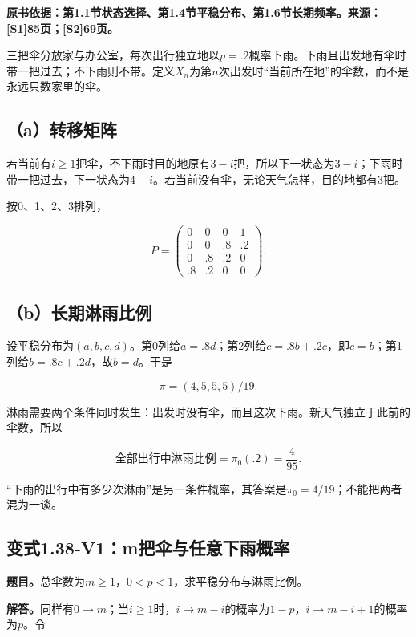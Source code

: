 \documentclass[
  11pt,
  a4paper,
  UTF8,
  fontset=fandol]{ctexart}
\begin{document}
\textbf{原书依据：第1.1节状态选择、第1.4节平稳分布、第1.6节长期频率。来源：{[}S1{]}85页；{[}S2{]}69页。}

三把伞分放家与办公室，每次出行独立地以\(p=.2\)概率下雨。下雨且出发地有伞时带一把过去；不下雨则不带。定义\(X_n\)为第\(n\)次出发时``当前所在地''的伞数，而不是永远只数家里的伞。

\subsection{（a）转移矩阵}\label{aux8f6cux79fbux77e9ux9635}

若当前有\(i\ge1\)把伞，不下雨时目的地原有\(3-i\)把，所以下一状态为\(3-i\)；下雨时带一把过去，下一状态为\(4-i\)。若当前没有伞，无论天气怎样，目的地都有3把。

按0、1、2、3排列，

\[
P=\begin{pmatrix}
0&0&0&1\\0&0&.8&.2\\0&.8&.2&0\\.8&.2&0&0
\end{pmatrix}.
\]

\subsection{（b）长期淋雨比例}\label{bux957fux671fux6dcbux96e8ux6bd4ux4f8b}

设平稳分布为\((a,b,c,d)\)。第0列给\(a=.8d\)；第2列给\(c=.8b+.2c\)，即\(c=b\)；第1列给\(b=.8c+.2d\)，故\(b=d\)。于是

\[
\boxed{\pi=(4,5,5,5)/19.}
\]

淋雨需要两个条件同时发生：出发时没有伞，而且这次下雨。新天气独立于此前的伞数，所以

\[
\boxed{\text{全部出行中淋雨比例}=\pi_0(.2)=\frac4{95}.}
\]

``下雨的出行中有多少次淋雨''是另一条件概率，其答案是\(\pi_0=4/19\)；不能把两者混为一谈。

\subsection{变式1.38-V1：m把伞与任意下雨概率}\label{ux53d8ux5f0f1.38-v1mux628aux4f1eux4e0eux4efbux610fux4e0bux96e8ux6982ux7387}

\textbf{题目。}总伞数为\(m\ge1\)，\(0<p<1\)，求平稳分布与淋雨比例。

\textbf{解答。}同样有\(0\to m\)；当\(i\ge1\)时，\(i\to m-i\)的概率为\(1-p\)，\(i\to m-i+1\)的概率为\(p\)。令
\end{document}
